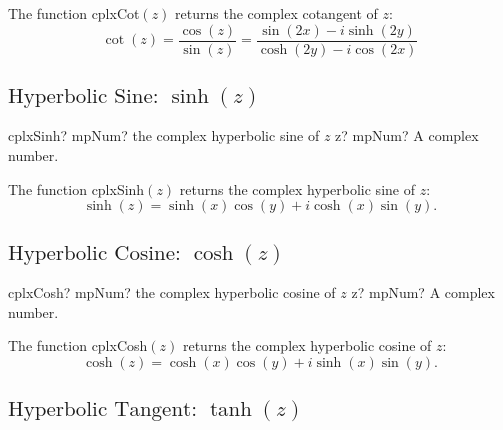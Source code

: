 \vspace{0.3cm}
The function \textsf{cplxCot$(z)$} returns the complex cotangent of $z$: 
\begin{equation}
	\cot(z) =\frac{\cos(z)}{\sin(z)} = \frac{\sin(2x)-i \sinh(2y)}{\cosh(2y)-i \cos(2x)}
\end{equation}




\newpage
\subsection{\texorpdfstring{$\text{Hyperbolic Sine: }\sinh(z)$}{sinh}}

\begin{mpFunctionsExtract}
	\mpFunctionOne
	{cplxSinh? mpNum? the complex hyperbolic sine of $z$}
	{z? mpNum? A complex number.}
\end{mpFunctionsExtract}

\vspace{0.3cm}
The function \textsf{cplxSinh$(z)$} returns the complex hyperbolic sine of $z$: 
\begin{equation}
	\sinh(z) = \sinh(x) \cos(y) + i \cosh(x) \sin(y).
\end{equation}





\newpage
\subsection{\texorpdfstring{$\text{Hyperbolic Cosine: }\cosh(z)$}{cosh}}

\begin{mpFunctionsExtract}
	\mpFunctionOne
	{cplxCosh? mpNum? the complex hyperbolic cosine of $z$}
	{z? mpNum? A complex number.}
\end{mpFunctionsExtract}

\vspace{0.3cm}
The function \textsf{cplxCosh$(z)$} returns the complex hyperbolic cosine of $z$: 
\begin{equation}
	\cosh(z) = \cosh(x) \cos(y) + i \sinh(x) \sin(y).
\end{equation}





\newpage
\subsection{\texorpdfstring{$\text{Hyperbolic Tangent: }\tanh(z)$}{tanh}}

